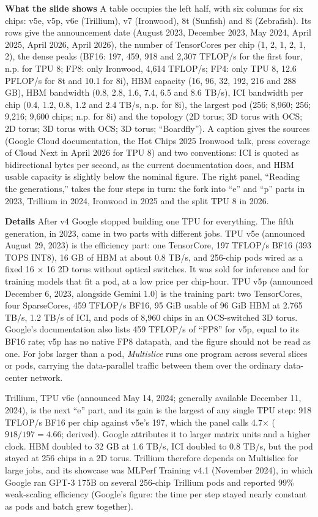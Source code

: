 \documentclass[11pt,letterpaper]{article}
\newcommand{\para}[1]{\medskip\noindent\textbf{#1}\quad}
\begin{document}
\para{What the slide shows} A table occupies the left half, with six columns for six chips: v5e, v5p, v6e (Trillium), v7 (Ironwood), 8t (Sunfish) and 8i (Zebrafish). Its rows give the announcement date (August 2023, December 2023, May 2024, April 2025, April 2026, April 2026), the number of TensorCores per chip (1, 2, 1, 2, 1, 2), the dense peaks (BF16: 197, 459, 918 and 2{,}307 TFLOP/s for the first four, n.p. for TPU 8; FP8: only Ironwood, 4{,}614 TFLOP/s; FP4: only TPU 8, 12.6 PFLOP/s for 8t and 10.1 for 8i), HBM capacity (16, 96, 32, 192, 216 and 288 GB), HBM bandwidth (0.8, 2.8, 1.6, 7.4, 6.5 and 8.6 TB/s), ICI bandwidth per chip (0.4, 1.2, 0.8, 1.2 and 2.4 TB/s, n.p. for 8i), the largest pod (256; 8{,}960; 256; 9{,}216; 9{,}600 chips; n.p. for 8i) and the topology (2D torus; 3D torus with OCS; 2D torus; 3D torus with OCS; 3D torus; ``Boardfly''). A caption gives the sources (Google Cloud documentation, the Hot Chips 2025 Ironwood talk, press coverage of Cloud Next in April 2026 for TPU 8) and two conventions: ICI is quoted as bidirectional bytes per second, as the current documentation does, and HBM usable capacity is slightly below the nominal figure. The right panel, ``Reading the generations,'' takes the four steps in turn: the fork into ``e'' and ``p'' parts in 2023, Trillium in 2024, Ironwood in 2025 and the split TPU 8 in 2026.

\para{Details} After v4 Google stopped building one TPU for everything. The fifth generation, in 2023, came in two parts with different jobs. TPU v5e (announced August 29, 2023) is the efficiency part: one TensorCore, 197 TFLOP/s BF16 (393 TOPS INT8), 16 GB of HBM at about 0.8 TB/s, and 256-chip pods wired as a fixed 16 $\times$ 16 2D torus without optical switches. It was sold for inference and for training models that fit a pod, at a low price per chip-hour. TPU v5p (announced December 6, 2023, alongside Gemini 1.0) is the training part: two TensorCores, four SparseCores, 459 TFLOP/s BF16, 95 GiB usable of 96 GiB HBM at 2.765 TB/s, 1.2 TB/s of ICI, and pods of 8{,}960 chips in an OCS-switched 3D torus. Google's documentation also lists 459 TFLOP/s of ``FP8'' for v5p, equal to its BF16 rate; v5p has no native FP8 datapath, and the figure should not be read as one. For jobs larger than a pod, \emph{Multislice} runs one program across several slices or pods, carrying the data-parallel traffic between them over the ordinary data-center network.

Trillium, TPU v6e (announced May 14, 2024; generally available December 11, 2024), is the next ``e'' part, and its gain is the largest of any single TPU step: 918 TFLOP/s BF16 per chip against v5e's 197, which the panel calls 4.7$\times$ ($918 / 197 = 4.66$; derived). Google attributes it to larger matrix units and a higher clock. HBM doubled to 32 GB at 1.6 TB/s, ICI doubled to 0.8 TB/s, but the pod stayed at 256 chips in a 2D torus. Trillium therefore depends on Multislice for large jobs, and its showcase was MLPerf Training v4.1 (November 2024), in which Google ran GPT-3 175B on several 256-chip Trillium pods and reported 99\% weak-scaling efficiency (Google's figure: the time per step stayed nearly constant as pods and batch grew together).
\end{document}
